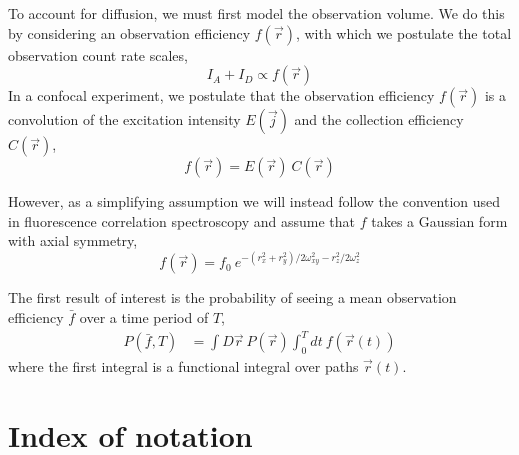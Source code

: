 \documentclass{article}
\begin{document}
To account for diffusion, we must first model the observation
volume. We do this by considering an observation efficiency $f(\vec
r)$, with which we postulate the total observation count rate scales,
\[ I_A + I_D \propto f(\vec r) \]
In a confocal experiment, we postulate that the observation efficiency
$f(\vec r)$ is a convolution of the excitation intensity $E(\vec j)$
and the collection efficiency $C(\vec r)$,
\[ f(\vec r) = E(\vec r) ~ C(\vec r) \]

However, as a simplifying assumption we will instead follow the
convention used in fluorescence correlation
spectroscopy\cite{Magde1972} and assume that $f$ takes a Gaussian form
with axial symmetry,
\[ f(\vec r) = f_0 ~ e^{- (r_x^2 + r_y^2) / 2 \omega_{xy}^2 - r_z^2 / 2 \omega_z^2} \]

The first result of interest is the probability of seeing a mean
observation efficiency $\bar f$ over a time period of $T$,
\begin{align*}
  P(\bar f, T) & = \int D\vec{r}~ P(\vec{r}) \int_0^T dt~ f(\vec{r}(t))
\end{align*}
where the first integral is a functional integral over paths
$\vec r(t)$.

\section{Index of notation}
\end{document}
